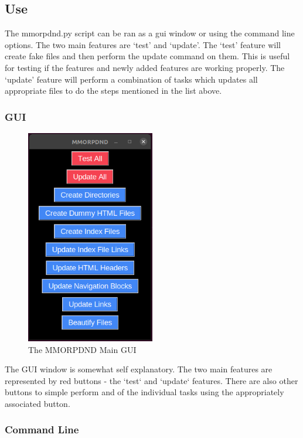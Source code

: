 \subsection{Use}

The mmorpdnd.py script can be ran as a gui window or using the command line options. The two main features are `test' and `update'. The `test' feature will create fake files and then perform the update command on them. This is useful for testing if the features and newly added features are working properly. The `update' feature will perform a combination of tasks which updates all appropriate files to do the steps mentioned in the list above.

\subsubsection{GUI}

\begin{figure}[h]
	\centering
	\includegraphics[width=0.5\textwidth]{images/mmorpdnd_gui.png}
	\caption{The MMORPDND Main GUI}
	\label{fig:mmorpdnd_gui}
\end{figure}

The GUI window is somewhat self explanatory. The two main features are represented by red buttons - the `test` and `update` features. There are also other buttons to simple perform and of the individual tasks using the appropriately associated button.

\subsubsection{Command Line}

